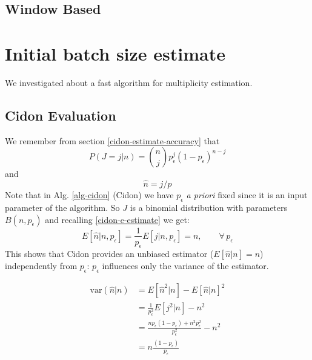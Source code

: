 \documentclass[12pt,a4paper]{report}
\newcommand{\pc}{p_{\epsilon}}
\begin{document}
\section{Window Based}
\chapter{Initial batch size estimate}
We investigated about a fast algorithm for multiplicity estimation.\\

\section{Cidon Evaluation}

\begin{equation*}
\end{equation*}
We remember from section \ref{cidon-estimate-accuracy} that
\begin{equation*}P(J=j|n)={n \choose j}\pc^{j}(1-\pc)^{n-j}\end{equation*}
and
\begin{equation*}\hat{n}=j/p\end{equation*}
Note that  in Alg. \ref{alg-cidon} (Cidon) we have $\pc$ \emph{a priori} fixed since it is an input parameter of the algorithm. So $J$ is a binomial distribution with parameters $B(n,\pc)$ and recalling \eqref{cidon-e-estimate}
we get:
\begin{equation}
E[\hat{n}|n,\pc]=\frac{1}{\pc}E\left[j|n,\pc\right]=n, \qquad \forall \,\pc
\end{equation}
This shows that Cidon provides an unbiased estimator ($E[\hat{n}|n]=n$) independently from $\pc$: $\pc$ influences only the variance of the estimator. 

\begin{equation}
\begin{split}
\textrm{var}(\hat{n}|n) & =E[\hat{n}^{2}|n]- E[\hat{n}|n]^{2}\\
& = \frac{1}{\pc^{2}}E[j^{2}|n] - n^{2}\\
& = \frac{n\pc(1-\pc)+n^{2}\pc^{2}}{\pc^{2}}- n^{2}\\
& = n \frac{(1-\pc)}{\pc}
\end{split}
\end{equation}
\end{document}
